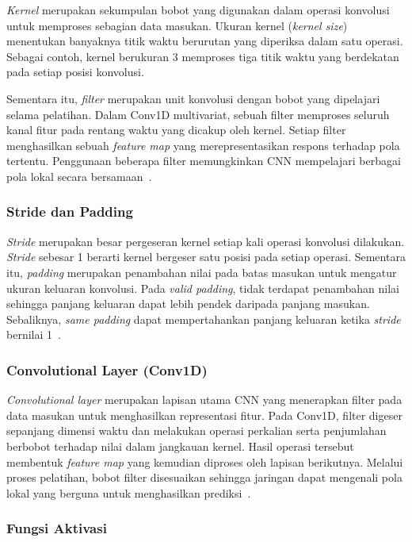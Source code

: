 \documentclass[10pt,conference]{IEEEtran}
\begin{document}
\textit{Kernel} merupakan sekumpulan bobot yang digunakan dalam operasi konvolusi untuk memproses sebagian data masukan. Ukuran kernel (\textit{kernel size}) menentukan banyaknya titik waktu berurutan yang diperiksa dalam satu operasi. Sebagai contoh, kernel berukuran 3 memproses tiga titik waktu yang berdekatan pada setiap posisi konvolusi.

Sementara itu, \textit{filter} merupakan unit konvolusi dengan bobot yang dipelajari selama pelatihan. Dalam Conv1D multivariat, sebuah filter memproses seluruh kanal fitur pada rentang waktu yang dicakup oleh kernel. Setiap filter menghasilkan sebuah \textit{feature map} yang merepresentasikan respons terhadap pola tertentu. Penggunaan beberapa filter memungkinkan CNN mempelajari berbagai pola lokal secara bersamaan~\cite{conv1d}.

\subsubsection{Stride dan Padding}

\textit{Stride} merupakan besar pergeseran kernel setiap kali operasi konvolusi dilakukan. \textit{Stride} sebesar 1 berarti kernel bergeser satu posisi pada setiap operasi. Sementara itu, \textit{padding} merupakan penambahan nilai pada batas masukan untuk mengatur ukuran keluaran konvolusi. Pada \textit{valid padding}, tidak terdapat penambahan nilai sehingga panjang keluaran dapat lebih pendek daripada panjang masukan. Sebaliknya, \textit{same padding} dapat mempertahankan panjang keluaran ketika \textit{stride} bernilai 1~\cite{conv1d}.

\subsubsection{Convolutional Layer (Conv1D)}

\textit{Convolutional layer} merupakan lapisan utama CNN yang menerapkan filter pada data masukan untuk menghasilkan representasi fitur. Pada Conv1D, filter digeser sepanjang dimensi waktu dan melakukan operasi perkalian serta penjumlahan berbobot terhadap nilai dalam jangkauan kernel. Hasil operasi tersebut membentuk \textit{feature map} yang kemudian diproses oleh lapisan berikutnya. Melalui proses pelatihan, bobot filter disesuaikan sehingga jaringan dapat mengenali pola lokal yang berguna untuk menghasilkan prediksi~\cite{conv1d}.

\subsubsection{Fungsi Aktivasi}
\end{document}
